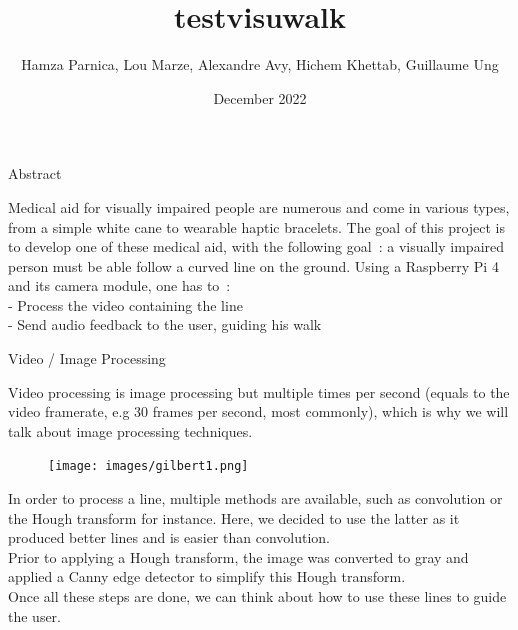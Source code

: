 \documentclass{article}
\title{testvisuwalk}
\author{Hamza Parnica, Lou Marze, Alexandre Avy, Hichem Khettab, Guillaume Ung}
\date{December 2022}
\begin{document}
\begin{multicols}{2}

\begin{center} \Huge Abstract
\end{center}
\LARGE
Medical aid for visually impaired people are numerous and come in various types, from a simple white cane to wearable haptic bracelets.
The goal of this project is to develop one of these medical aid, with the  following goal :
a visually impaired person must be able follow a curved line on the ground.
Using a Raspberry Pi 4 and its camera module, one has to : \\
- Process the video containing the line \\
- Send audio feedback to the user, guiding his walk



\begin{center} \Huge Video / Image Processing
\end{center}
\LARGE
Video processing is image processing but multiple times per second (equals to the video framerate, e.g 30 frames per second, most commonly), which is why we will talk about image processing techniques. \\ 

\begin{figure}[h]
\centering
\texttt{[image: images/gilbert1.png]}
\end{figure}

In order to process a line, multiple methods are available, such as convolution or the Hough transform for instance. Here, we decided to use the latter as it produced better lines and is easier than convolution. \\
Prior to applying a Hough transform, the image was converted to gray and applied a Canny edge detector to simplify this Hough transform. \\
Once all these steps are done, we can think about how to use these lines to guide the user.

\LARGE \blindtext\blindtext
\blindtext\blindtext


\end{multicols}
\end{document}
